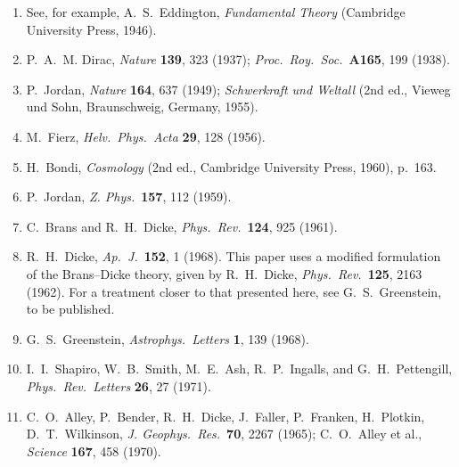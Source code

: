 \begin{enumerate}
  \item{}\label{ch16-ref-22}
  See, for example, A.~S.~Eddington, \emph{Fundamental Theory}
  (Cambridge University Press, 1946).

  \item{}\label{ch16-ref-23}
  P.~A.~M. Dirac, \emph{Nature} \textbf{139}, 323 (1937);
  \emph{Proc.\ Roy.\ Soc.}\ \textbf{A165}, 199 (1938).

  \item{}\label{ch16-ref-24}
  P.~Jordan, \emph{Nature} \textbf{164}, 637 (1949);
  \emph{Schwerkraft und Weltall}
  (2nd ed., Vieweg und Sohn, Braunschweig, Germany, 1955).

  \item{}\label{ch16-ref-25}
  M.~Fierz, \emph{Helv.\ Phys.\ Acta} \textbf{29}, 128 (1956).

  \item{}\label{ch16-ref-26}
  H.~Bondi, \emph{Cosmology}
  (2nd ed., Cambridge University Press, 1960), p.~163.

  \item{}\label{ch16-ref-27}
  P.~Jordan, \emph{Z. Phys.}\ \textbf{157}, 112 (1959).

  \item{}\label{ch16-ref-28}
  C.~Brans and R.~H.~Dicke,
  \emph{Phys.\ Rev.}\ \textbf{124}, 925 (1961).

  \item{}\label{ch16-ref-29}
  R.~H.~Dicke, \emph{Ap.\ J.}\ \textbf{152}, 1 (1968). This paper uses
  a modified formulation of the Brans--Dicke theory, given by R.~H.~Dicke,
  \emph{Phys.\ Rev.}\ \textbf{125}, 2163 (1962). For a treatment closer
  to that presented here, see G.~S.~Greenstein, to be published.

  \item{}\label{ch16-ref-30}
  G.~S.~Greenstein, \emph{Astrophys.\ Letters} \textbf{1}, 139 (1968).

  \item{}\label{ch16-ref-31}
  I.~I.~Shapiro, W.~B.~Smith, M.~E.~Ash, R.~P.~Ingalls, and
  G.~H.~Pettengill, \emph{Phys.\ Rev.\ Letters} \textbf{26}, 27 (1971).

  \item{}\label{ch16-ref-32}
  C.~O.~Alley, P.~Bender, R.~H.~Dicke, J.~Faller, P.~Franken,
  H.~Plotkin, D.~T.~Wilkinson, \emph{J. Geophys.\ Res.}\ \textbf{70},
  2267 (1965); C.~O.~Alley et al., \emph{Science} \textbf{167}, 458
  (1970).


\end{enumerate}
